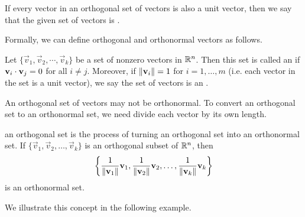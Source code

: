 \documentclass{ximera}
\begin{document}
If every vector in an orthogonal set of vectors is also a unit vector, then we say that the given set of vectors is .

\begin{center}
 \quad\quad\quad
\end{center}

Formally, we can define orthogonal and orthonormal vectors as follows.

\begin{definition}\label{orthset}
Let $\{ \vec{v}_1, \vec{v}_2, \cdots, \vec{v}_k \}$ be a set of nonzero
vectors in $\mathbb{R}^n$. Then this set is called an
 if 
$\mathbf{v}_i \cdot \mathbf{v}_j = 0$ for all $i \neq j$.
Moreover, if $\left\lVert\mathbf{v}_i\right\rVert=1$ for $i=1,\ldots,m$ (i.e. each vector in the set is a unit vector), we say the set of vectors is an .
\end{definition}

An orthogonal set of vectors may not be orthonormal.  To convert an orthogonal set to an orthonormal set, we need divide each vector by its own length.

\begin{definition}\label{normalizing}
 an orthogonal set is the process of turning an orthogonal set into an orthonormal set.
If $\{ \vec{v}_1, \vec{v}_2, \ldots, \vec{v}_k\}$
is an orthogonal subset of $\mathbb{R}^n$,
then
\[ \left\{
\frac{1}{\left\lVert\mathbf{v}_1\right\rVert}\mathbf{v}_1,
\frac{1}{\left\lVert\mathbf{v}_2\right\rVert}\mathbf{v}_2, \ldots,
\frac{1}{\left\lVert\mathbf{v}_k\right\rVert}\mathbf{v}_k \right\}
\]
is an orthonormal set.
\end{definition}

We illustrate this concept in the following example.
\end{document}
